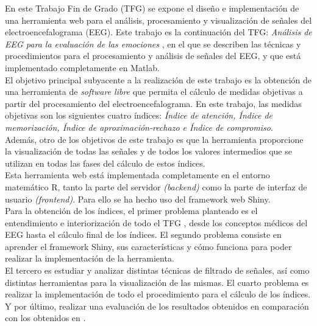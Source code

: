 En este Trabajo Fin de Grado (\gls{TFG}) se expone el diseño e implementación de una herramienta web para el análisis, procesamiento y visualización de señales del electroencefalograma (\gls{EEG}). Este trabajo es la continuación del \gls{TFG}: \textit{Análisis de \gls{EEG} para la evaluación de las emociones} \cite{tesis-hugo}, en el que se describen las técnicas y procedimientos para el procesamiento y análisis de señales del \gls{EEG}, y que está implementado completamente en Matlab. \\

El objetivo principal subyacente a la realización de este trabajo es la obtención de una herramienta de \textit{software libre} que permita el cálculo de medidas objetivas a partir del procesamiento del electroencefalograma. En este trabajo, las medidas objetivas son los siguientes cuatro índices: \textit{Índice de atención, Índice de memorización, Índice de aproximación-rechazo e Índice de compromiso}. \\

Además, otro de los objetivos de este trabajo es que la herramienta proporcione la visualización de todas las señales y de todos los valores intermedios que se utilizan en todas las fases del cálculo de estos índices.\\

Esta herramienta web está implementada completamente en el entorno matemático R, tanto la parte del servidor \textit{(backend)} como la parte de interfaz de usuario \textit{(frontend)}. Para ello se ha hecho uso del framework web Shiny. \\

Para la obtención de los índices, el primer problema planteado es el entendimiento e interiorización de todo el \gls{TFG} \cite{tesis-hugo}, desde los conceptos médicos del \gls{EEG} hasta el cálculo final de los índices. El segundo problema consiste en aprender el framework Shiny, sus características y cómo funciona para poder realizar la implementación de la herramienta. \\

El tercero es estudiar y analizar distintas técnicas de filtrado de señales, así como distintas herramientas para la visualización de las mismas. El cuarto problema es realizar la implementación de todo el procedimiento para el cálculo de los índices. Y por último, realizar una evaluación de los resultados obtenidos en comparación con los obtenidos en \cite{tesis-hugo}.


